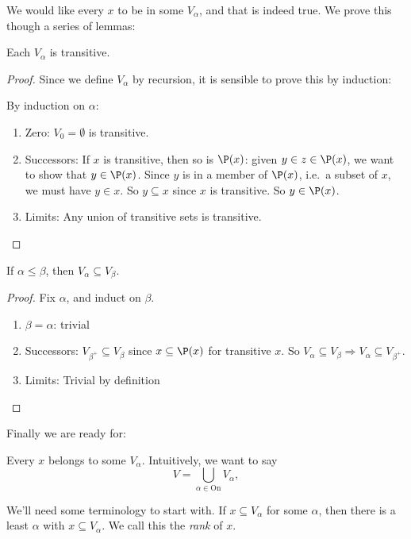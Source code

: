 \documentclass[a4paper]{article}
\begin{document}
We would like every $x$ to be in some $V_\alpha$, and that is indeed true. We prove this though a series of lemmas:

\begin{lemma}
  Each $V_\alpha$ is transitive.
\end{lemma}

\begin{proof}
  Since we define $V_\alpha$ by recursion, it is sensible to prove this by induction:

  By induction on $\alpha$:
  \begin{enumerate}
    \item Zero: $V_0 = \emptyset$ is transitive.
    \item Successors: If $x$ is transitive, then so is $\P(x)$: given $y\in z\in \P(x)$, we want to show that $y\in \P(x)$. Since $y$ is in a member of $\P(x)$, i.e.\ a subset of $x$, we must have $y\in x$. So $y\subseteq x$ since $x$ is transitive. So $y\in \P(x)$.
    \item Limits: Any union of transitive sets is transitive.
  \end{enumerate}
\end{proof}

\begin{lemma}
  If $\alpha \leq \beta$, then $V_\alpha \subseteq V_\beta$.
\end{lemma}

\begin{proof}
  Fix $\alpha$, and induct on $\beta$.
  \begin{enumerate}
    \item $\beta = \alpha$: trivial
    \item Successors: $V_{\beta^+}\subseteq V_\beta$ since $x\subseteq \P(x)$ for transitive $x$. So $V_\alpha \subseteq V_\beta \Rightarrow V_\alpha \subseteq V_{\beta^+}$.
    \item Limits: Trivial by definition
  \end{enumerate}
\end{proof}

Finally we are ready for:
\begin{thm}
  Every $x$ belongs to some $V_\alpha$. Intuitively, we want to say
  \[
    V = \bigcup_{\alpha \in \mathrm{On}} V_\alpha,
  \]
\end{thm}
We'll need some terminology to start with. If $x\subseteq V_\alpha$ for some $\alpha$, then there is a least $\alpha$ with $x\subseteq V_\alpha$. We call this the \emph{rank} of $x$.
\end{document}
